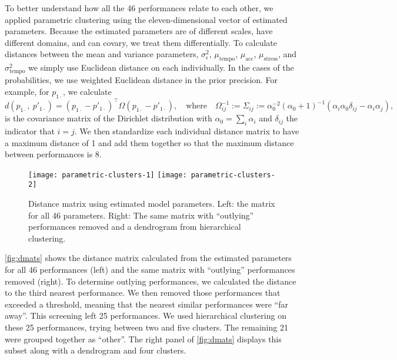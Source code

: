 \documentclass[12pt]{article}
\begin{document}
To better understand how all the 46 performances relate to each other,
we applied parametric clustering using the eleven-dimensional vector
of estimated parameters. Because the estimated parameters are of
different scales, have different domains, and can covary, we treat
them differentially. To calculate distances between the mean and
variance parameters, $\sigma^2_\epsilon$, $\mu_{\textrm{tempo}}$,
$\mu_{\textrm{acc}}$, $\mu_{\textrm{stress}}$, and
$\sigma^2_{\textrm{tempo}}$ we simply use Euclidean distance on each
individually. In the cases of the probabilities, we use weighted
Euclidean distance in the prior precision. For example, for
$p_{1\cdot}$, we calculate
\begin{equation}
d\left(p_{1\cdot},\ p'_{1\cdot}\right) = (p_{1\cdot}-p'_{1\cdot})^\top
  \Omega (p_{1\cdot}-p'_{1\cdot}),\quad
\textrm{where}
  \quad\Omega^{-1}_{ij} := \Sigma_{ij} :=
  \alpha_0^{-2}(\alpha_0+1)^{-1}\left(\alpha_i\alpha_0 \delta_{ij}
    - \alpha_i\alpha_j\right),
\end{equation}
is the covariance matrix of the Dirichlet distribution with
$\alpha_0=\sum_i\alpha_i$ and $\delta_{ij}$ the indicator that
$i=j$. We then standardize each individual distance matrix to have a
maximum distance of 1 and add them together so that the maximum distance
between performances is 8.


\begin{figure}[t]
  \centering
  \texttt{[image: parametric-clusters-1]}
  \texttt{[image: parametric-clusters-2]}
  \caption{Distance matrix using estimated model parameters. Left: the
    matrix for all 46 parameters. Right: The same matrix with
    ``outlying'' performances removed and a dendrogram from hierarchical
    clustering.}
  \label{fig:dmats}
\end{figure}
\autoref{fig:dmats} shows the distance matrix calculated from the
estimated parameters for all 46 performances (left) and the same
matrix with ``outlying'' performances removed (right). To determine
outlying performances, we calculated the distance to the third nearest
performance. We then removed those performances that exceeded a
threshold, meaning that the nearest similar performances were ``far
away''. This screening left 25 performances. We used hierarchical
clustering on these 25 performances, trying between two and five
clusters. The remaining 21 were grouped together as ``other''. The
right panel of \autoref{fig:dmats} displays this subset along with a
dendrogram and four clusters.
\end{document}
